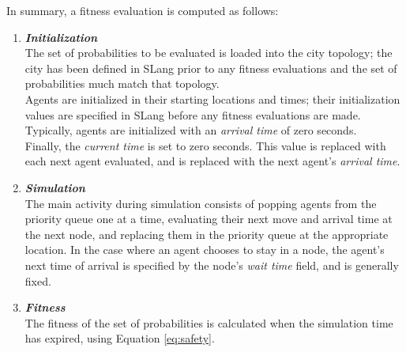 \documentclass{sig-alternate-05-2015}
\begin{document}
In summary, a fitness evaluation is computed as follows:
\begin{enumerate}
\item \textbf{\textit{Initialization}}\\ The set of probabilities to
  be evaluated is loaded into the city topology; the city has been
  defined in SLang prior to any fitness evaluations and the set of
  probabilities much match that topology.\\ Agents are initialized in
  their starting locations and times; their initialization values are
  specified in SLang before any fitness evaluations are made.
  Typically, agents are initialized with an \emph{arrival time} of zero seconds.\\ 
  Finally, the \emph{current time} is set to zero
  seconds.  This value is replaced with each next agent evaluated, and
  is replaced with the next agent's \emph{arrival time}.
\item \textbf{\textit{Simulation}}\\ The main activity during
  simulation consists of popping agents from the priority queue one at
  a time, evaluating their next move and arrival time at the next
  node, and replacing them in the priority queue at the appropriate
  location.  In the case where an agent chooses to stay in a node, the
  agent's next time of arrival is specified by the node's
  \emph{wait time} field, and is generally fixed.
\item \textbf{\textit{Fitness}}\\ The fitness of the set of
  probabilities is calculated when the simulation time has expired,
  using Equation \ref{eq:safety}.
\end{enumerate}
%
%
%
%
\end{document}
